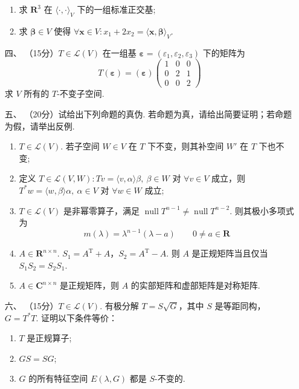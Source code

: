 \begin{enumerate}
\begin{enumerate}[label=(\arabic*)]
        \item 求 $ \mathbf{R}^3 $ 在 $ \langle \cdot, \cdot \rangle_V $ 下的一组标准正交基;
        \item 求 $ \boldsymbol{\beta} \in V $ 使得 $ \forall \boldsymbol{x} \in V: x_1 + 2x_2 = \langle \boldsymbol{x}, \boldsymbol{\beta} \rangle_V $.
    \end{enumerate}
	\item[四、]（15分）$ T \in \mathcal{L}(V) $ 在一组基 $ \boldsymbol{\varepsilon} = (\varepsilon_1, \varepsilon_2, \varepsilon_3) $ 下的矩阵为
    \[ T(\boldsymbol{\varepsilon}) = (\boldsymbol{\varepsilon}) \begin{pmatrix} 1 & 0 & 0 \\ 0 & 2 & 1 \\ 0 & 0 & 2 \end{pmatrix} \]
    求 $ V $ 所有的 $ T $-不变子空间.
	\item[五、]（20分）试给出下列命题的真伪. 若命题为真，请给出简要证明；若命题为假，请举出反例.
	\begin{enumerate}[label=(\arabic*)]
        \item $ T \in \mathcal{L}(V) $. 若子空间 $ W \in V $ 在 $ T $ 下不变，则其补空间 $ W' $ 在 $ T $ 下也不变;
        \item 定义 $ T \in \mathcal{L}(V, W) : Tv = \langle v, \alpha \rangle \beta,\ \beta \in W $ 对 $ \forall v \in V $ 成立，则 $ T^* w = \langle w, \beta \rangle \alpha,\ \alpha \in V $ 对 $ \forall w \in W $ 成立;
        \item $ T \in \mathcal{L}(V) $ 是非幂零算子，满足 $ \operatorname{null} T^{n - 1} \neq \operatorname{null} T^{n - 2} $. 则其极小多项式为
        \[ m(\lambda) = \lambda^{n-1}(\lambda - a) \qquad 0 \neq a \in \mathbf{R} \]
        \item $ A \in \mathbf{R}^{n \times n} $. $ S_1 = A^{\mathrm{T}} + A $，$ S_2 = A^{\mathrm{T}} - A $. 则 $ A $ 是正规矩阵当且仅当 $ S_1 S_2 = S_2 S_1 $.
        \item $ A \in \mathbf{C}^{n \times n} $ 是正规矩阵，则 $ A $ 的实部矩阵和虚部矩阵是对称矩阵.
    \end{enumerate}
	\item[六、]（15分）$ T \in \mathcal{L}(V) $. 有极分解 $ T = S \sqrt{G} $，其中 $ S $ 是等距同构，$ G = T^* T $. 证明以下条件等价：
    \begin{enumerate}[label=(\arabic*)]
        \item $ T $ 是正规算子;
        \item $ GS = SG $;
        \item $ G $ 的所有特征空间 $ E(\lambda, G) $ 都是 $ S $-不变的.
    \end{enumerate}
\end{enumerate}

\newpage
